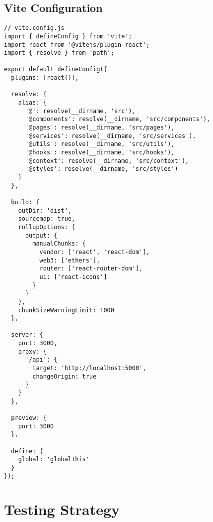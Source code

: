 \documentclass[12pt,a4paper]{article}
\begin{document}
\subsection{Vite Configuration}
\begin{lstlisting}[caption=Vite Build Config]
// vite.config.js
import { defineConfig } from 'vite';
import react from '@vitejs/plugin-react';
import { resolve } from 'path';

export default defineConfig({
  plugins: [react()],
  
  resolve: {
    alias: {
      '@': resolve(__dirname, 'src'),
      '@components': resolve(__dirname, 'src/components'),
      '@pages': resolve(__dirname, 'src/pages'),
      '@services': resolve(__dirname, 'src/services'),
      '@utils': resolve(__dirname, 'src/utils'),
      '@hooks': resolve(__dirname, 'src/hooks'),
      '@context': resolve(__dirname, 'src/context'),
      '@styles': resolve(__dirname, 'src/styles')
    }
  },

  build: {
    outDir: 'dist',
    sourcemap: true,
    rollupOptions: {
      output: {
        manualChunks: {
          vendor: ['react', 'react-dom'],
          web3: ['ethers'],
          router: ['react-router-dom'],
          ui: ['react-icons']
        }
      }
    },
    chunkSizeWarningLimit: 1000
  },

  server: {
    port: 3000,
    proxy: {
      '/api': {
        target: 'http://localhost:5000',
        changeOrigin: true
      }
    }
  },

  preview: {
    port: 3000
  },

  define: {
    global: 'globalThis'
  }
});
\end{lstlisting}

\section{Testing Strategy}
\end{document}

